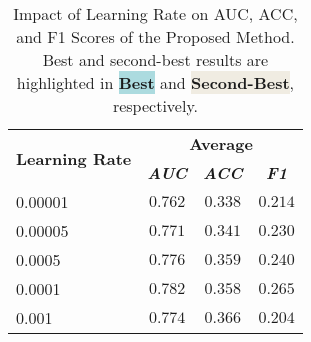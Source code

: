 \begin{table}[t]
    \caption{
        Impact of Learning Rate on AUC, ACC, and F1 Scores of the Proposed Method.
        Best and second-best results are highlighted in \colorbox[HTML]{ACDBDF}{\textbf{Best}} and \colorbox[HTML]{f0ece2}{\textbf{Second-Best}}, respectively.
        }
    \renewcommand{\arraystretch}{1.2} 
    \begin{center}
        \begin{tabular}{l|ccc}
            \hline
        \multirow{2}{*}{\textbf{Learning Rate}} &  \multicolumn{3}{c}{\textbf{Average}} \\
            \cline{2-4}
             & \textbf{\textit{AUC}} & \textbf{\textit{ACC}} & \textbf{\textit{F1}} \\
            \hline
            0.00001 & $0.762$ & $0.338$ & $0.214$ \\
            0.00005 & $0.771$ & $0.341$ & $0.230$ \\
            0.0005 & \cellcolor{2nd} $0.776$ & \cellcolor{2nd} $0.359$ & \cellcolor{2nd}$0.240$ \\
            0.0001 & \cellcolor{1st} $0.782$ & $0.358$ & \cellcolor{1st} $0.265$ \\
            0.001 &  $0.774$ & \cellcolor{2nd} $0.366$ & $0.204$ \\
            \hline
        \end{tabular}
    \label{tab:learning_rate_experiment}
    \end{center}
\end{table}


